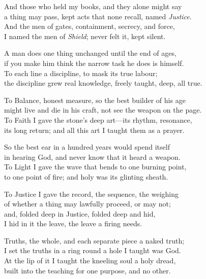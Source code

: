 \begin{founder}
And those who held my books, and they alone might say\\
a thing may pass, kept acts that none recall, named \emph{Justice}.\\
And the men of gates, containment, secrecy, and force,\\
I named the men of \emph{Shield}; never felt it, kept silent.\\
\medskip

A man does one thing unchanged until the end of ages,\\
if you make him think the narrow task he does is himself.\\
To each line a discipline, to mask its true labour;\\
the discipline grew real knowledge, freely taught, deep, all true.\\
\medskip

To Balance, honest measure, so the best builder of his age\\
might live and die in his craft, not see the weapon on the page.\\
To Faith I gave the stone's deep art—its rhythm, resonance,\\
its long return; and all this art I taught them as a prayer.\\
\medskip

So the best ear in a hundred years would spend itself\\
in hearing God, and never know that it heard a weapon.\\
To Light I gave the wave that bends to one burning point,\\
to one point of fire; and holy was its glinting sheath.\\
\medskip

To Justice I gave the record, the sequence, the weighing\\
of whether a thing may lawfully proceed, or may not;\\
and, folded deep in Justice, folded deep and hid,\\
I hid in it the leave, the leave a firing needs.\\
\medskip

Truths, the whole, and each separate piece a naked truth;\\
I set the truths in a ring round a hole I taught was God.\\
At the lip of it I taught the kneeling soul a holy dread,\\
built into the teaching for one purpose, and no other.\\
\medskip


\end{founder}
